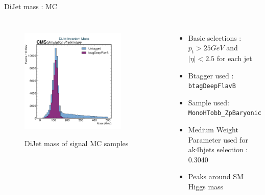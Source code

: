 \documentclass[10pt,xcolor=dvipsnames,aspectratio=169]{beamer}
\begin{document}
    
   \begin{frame}[fragile]{DiJet mass : MC} 
    \begin{columns}
    \begin{figure} 
    \centering 
     \includegraphics[width=0.8\textwidth]{../Archive/KinemPlots/DiJetsMC.png }
    \label{DiJetMC} 
    \caption{DiJet mass of signal MC samples}
    \end{figure} 
    \begin{itemize} 
    \raggedright 
    \small
    \item Basic selections : $p_t > 25 GeV $ and $|\eta | < 2.5 $ for each jet
    \item {Btagger used : \texttt{btagDeepFlavB}} 
    \item {Sample used: \texttt{MonoHTobb\_ZpBaryonic}} 
    \item Medium Weight Parameter used for ak4bjets selection : 0.3040
    \item Peaks around SM Higgs mass 
    \end{itemize}
    \end{columns} 
    \end{frame} 
    
\end{document}
